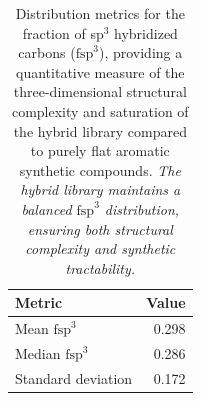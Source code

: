 \documentclass[journal=jcisd8,manuscript=suppinfo]{achemso}
\begin{document}
\begin{table}[htbp]
\centering
\caption{Distribution metrics for the fraction of sp$^3$ hybridized carbons ($\text{fsp}^3$), providing a quantitative measure of the three-dimensional structural complexity and saturation of the hybrid library compared to purely flat aromatic synthetic compounds. \textit{The hybrid library maintains a balanced $\text{fsp}^3$ distribution, ensuring both structural complexity and synthetic tractability.}}
\label{tab:fsp3}
\begin{tabular}{@{}l r@{}}
\toprule
\textbf{Metric} & \textbf{Value} \\
\midrule
Mean $\text{fsp}^3$ & \num{0.298} \\
Median $\text{fsp}^3$ & \num{0.286} \\
Standard deviation & \num{0.172} \\
\bottomrule
\end{tabular}
\end{table}
\end{document}
